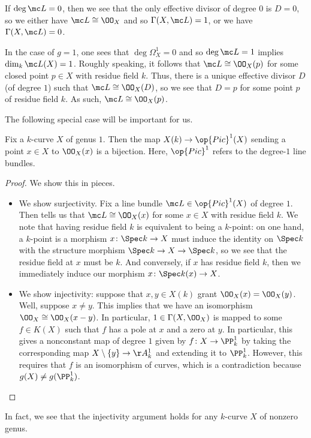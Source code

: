 \documentclass[../notes.tex]{subfiles}
\begin{document}
\begin{example}
	If $\deg\mc L=0$, then we see that the only effective divisor of degree $0$ is $D=0$, so we either have $\mc L\cong\OO_X$ and so $\Gamma(X,\mc L)=1$, or we have $\Gamma(X,\mc L)=0$.
\end{example}
\begin{example} \label{ex:rr-for-genus-1-deg-1}
	In the case of $g=1$, one sees that $\deg\Omega^1_X=0$ and so $\deg\mc L=1$ implies $\dim_k\mc L(X)=1$. Roughly speaking, it follows that $\mc L\cong\OO_X(p)$ for some closed point $p\in X$ with residue field $k$. Thus, there is a unique effective divisor $D$ (of degree $1$) such that $\mc L\cong\OO_X(D)$, so we see that $D=p$ for some point $p$ of residue field $k$. As such, $\mc L\cong\OO_X(p)$.
\end{example}
The following special case will be important for us.
\begin{theorem} \label{thm:deg-1-bundle-is-point}
	Fix a $k$-curve $X$ of genus $1$. Then the map $X(k)\to\op{Pic}^1(X)$ sending a point $x\in X$ to $\OO_X(x)$ is a bijection. Here, $\op{Pic}^1$ refers to the degree-$1$ line bundles.
\end{theorem}
\begin{proof}
	We show this in pieces.
	\begin{itemize}
		\item We show surjectivity. Fix a line bundle $\mc L\in\op{Pic}^1(X)$ of degree $1$. Then  tells us that $\mc L\cong\OO_X(x)$ for some $x\in X$ with residue field $k$. We note that having residue field $k$ is equivalent to being a $k$-point: on one hand, a $k$-point is a morphism $x\colon\Spec k\to X$ must induce the identity on $\Spec k$ with the structure morphism $\Spec k\to X\to\Spec k$, so we see that the residue field at $x$ must be $k$. And conversely, if $x$ has residue field $k$, then we immediately induce our morphism $x\colon\Spec k(x)\to X$.
		\item We show injectivity: suppose that $x,y\in X(k)$ grant $\OO_X(x)=\OO_X(y)$. Well, suppose $x\ne y$. This implies that we have an isomorphism $\OO_X\cong\OO_X(x-y)$. In particular, $1\in\Gamma(X,\OO_X)$ is mapped to some $f\in K(X)$ such that $f$ has a pole at $x$ and a zero at $y$. In particular, this gives a nonconstant map of degree $1$ given by $f\colon X\to\PP^1_k$ by taking the corresponding map $X\setminus\{y\}\to\AA^1_k$ and extending it to $\PP^1_k$. However, this requires that $f$ is an isomorphism of curves, which is a contradiction because $g(X)\ne g(\PP^1_k)$.
		\qedhere
	\end{itemize}
\end{proof}
\begin{remark}
	In fact, we see that the injectivity argument holds for any $k$-curve $X$ of nonzero genus.
\end{remark}
\end{document}
